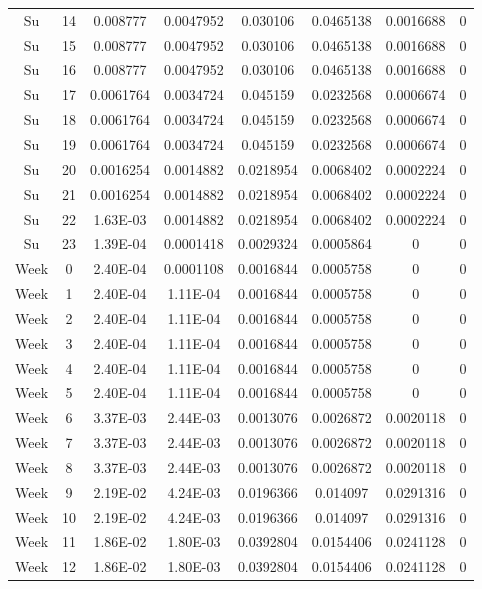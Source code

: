 \begin{center}
\begin{longtable}{cccccccc}
     Su & 14 & 0.008777 & 0.0047952 & 0.030106 & 0.0465138 & 0.0016688 & 0 \\  
     Su & 15 & 0.008777 & 0.0047952 & 0.030106 & 0.0465138 & 0.0016688 & 0 \\  
     Su & 16 & 0.008777 & 0.0047952 & 0.030106 & 0.0465138 & 0.0016688 & 0 \\  
     Su & 17 & 0.0061764 & 0.0034724 & 0.045159 & 0.0232568 & 0.0006674 & 0 \\  
     Su & 18 & 0.0061764 & 0.0034724 & 0.045159 & 0.0232568 & 0.0006674 & 0 \\  
     Su & 19 & 0.0061764 & 0.0034724 & 0.045159 & 0.0232568 & 0.0006674 & 0 \\  
     Su & 20 & 0.0016254 & 0.0014882 & 0.0218954 & 0.0068402 & 0.0002224 & 0 \\  
     Su & 21 & 0.0016254 & 0.0014882 & 0.0218954 & 0.0068402 & 0.0002224 & 0 \\  
     Su & 22 & 1.63E-03 & 0.0014882 & 0.0218954 & 0.0068402 & 0.0002224 & 0 \\  
     Su & 23 & 1.39E-04 & 0.0001418 & 0.0029324 & 0.0005864 & 0 & 0 \\  
    Week & 0 & 2.40E-04 & 0.0001108 & 0.0016844 & 0.0005758 & 0 & 0 \\  
    Week & 1 & 2.40E-04 & 1.11E-04 & 0.0016844 & 0.0005758 & 0 & 0 \\  
    Week & 2 & 2.40E-04 & 1.11E-04 & 0.0016844 & 0.0005758 & 0 & 0 \\  
    Week & 3 & 2.40E-04 & 1.11E-04 & 0.0016844 & 0.0005758 & 0 & 0 \\  
    Week & 4 & 2.40E-04 & 1.11E-04 & 0.0016844 & 0.0005758 & 0 & 0 \\  
    Week & 5 & 2.40E-04 & 1.11E-04 & 0.0016844 & 0.0005758 & 0 & 0 \\  
    Week & 6 & 3.37E-03 & 2.44E-03 & 0.0013076 & 0.0026872 & 0.0020118 & 0 \\  
    Week & 7 & 3.37E-03 & 2.44E-03 & 0.0013076 & 0.0026872 & 0.0020118 & 0 \\  
    Week & 8 & 3.37E-03 & 2.44E-03 & 0.0013076 & 0.0026872 & 0.0020118 & 0 \\  
    Week & 9 & 2.19E-02 & 4.24E-03 & 0.0196366 & 0.014097 & 0.0291316 & 0 \\  
    Week & 10 & 2.19E-02 & 4.24E-03 & 0.0196366 & 0.014097 & 0.0291316 & 0 \\  
    Week & 11 & 1.86E-02 & 1.80E-03 & 0.0392804 & 0.0154406 & 0.0241128 & 0 \\  
    Week & 12 & 1.86E-02 & 1.80E-03 & 0.0392804 & 0.0154406 & 0.0241128 & 0 \\  

\end{longtable}
\end{center}
